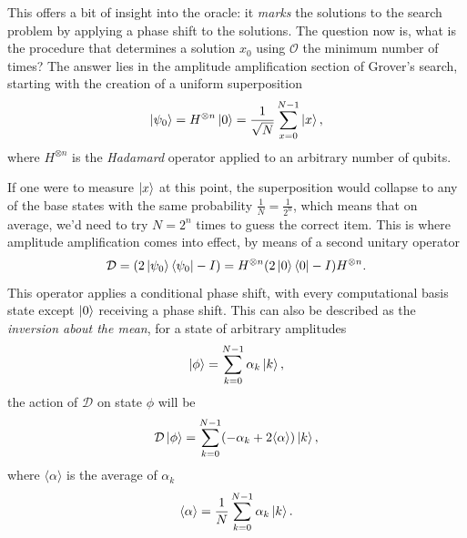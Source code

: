 \documentclass[../../dissertation.tex]{subfiles}
\begin{document}
This offers a bit of insight into the oracle: it \textit{marks} the solutions
to the search problem by applying a phase shift to the solutions. 
The question now is, what is the procedure that determines a solution $x_0$
using $\mathcal{O}$ the minimum number of times? The answer lies in the
amplitude amplification section of Grover's search, starting with the creation
of a uniform superposition
\begin{equation}
	\ket{\psi_0} = H^{\otimes n}\ket{0} = \frac{1}{\sqrt{N}}\sum_{x=0}^{N-1} \ket{x},
\end{equation}
where $H^{\otimes n}$ is the \textit{Hadamard} operator applied to an arbitrary
number of qubits.\par

If one were to measure $\ket{x}$ at this point, the superposition would collapse
to any of the base states with the same probability $\frac{1}{N} =
\frac{1}{2^n}$, which means that on average, we'd need to try $N = 2^n$ times
to guess the correct item.  This is where amplitude amplification comes into
effect, by means of a second unitary operator
\begin{equation}
	\mathcal{D} = (2\ket{\psi_0}\bra{\psi_0} - I) = H^{\otimes n}(2\ket{0}\bra{0} - I)H^{\otimes n}.
\end{equation}
This operator applies a conditional phase shift, with every computational basis
state except $\ket{0}$ receiving a phase shift. This can also be described as
the \textit{inversion about the mean}, for a state of arbitrary amplitudes
\begin{equation}
	\ket{\phi} = \sum_{k=0}^{N-1} \alpha_k\ket{k},
\end{equation}
the action of $\mathcal{D}$ on state $\phi$ will be
\begin{equation}
	\mathcal{D}\ket{\phi} = \sum_{k=0}^{N-1}(-\alpha_k + 2\langle \alpha \rangle)\ket{k},
\end{equation}
where $\langle \alpha \rangle$ is the average of $\alpha_k$
\begin{equation}
	\langle \alpha \rangle = \frac{1}{N} \sum_{k=0}^{N-1} \alpha_k\ket{k}.
\end{equation}
\par
\end{document}
